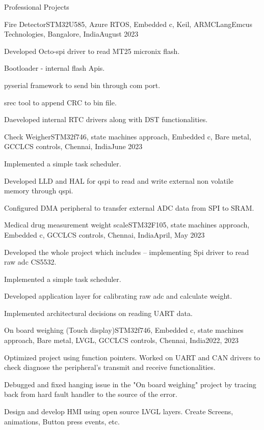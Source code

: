 \documentclass[]{Vetri-Resume}
\begin{document}
\begin{section}{Professional Projects}
\begin{subsection}{Fire Detector}{STM32U585, Azure RTOS, Embedded c, Keil, ARMCLang}{Emcus Technologies, Bangalore, India}{August 2023}
    \item{Developed Octo-spi driver to read MT25 micronix flash.}
    \item{Bootloader - internal flash Apis.}
    \item{pyserial framework to send bin through com port.}
    \item{srec tool to append CRC to bin file.}
    \item{Daeveloped internal RTC drivers along with DST functionalities.}

\end{subsection}



\begin{subsection}{Check Weigher}{STM32f746, state machines approach, Embedded c, Bare metal, GCC}{LCS controls, Chennai, India}{June 2023}
    \item{Implemented a simple task scheduler.}
    \item{Developed LLD and HAL for qspi to read and write external non volatile memory through qspi.}
    \item{Configured DMA peripheral to transfer external ADC data from SPI to SRAM.}
\end{subsection}
\begin{subsection}{Medical drug measurement weight scale}{STM32F105, state machines approach, Embedded c, GCC}{LCS controls, Chennai, India}{April, May 2023}
    \item{Developed the whole project which includes – implementing Spi driver to read raw adc CS5532.}
    \item{Implemented a simple task scheduler.}
    \item{Developed application layer for calibrating raw adc and calculate weight.}
    \item{Implemented architectural decisions on reading UART data.}
\end{subsection}

\begin{subsection}{On board weighing (Touch display)}{STM32f746, Embedded c, state machines approach, Bare metal, LVGL, GCC}{LCS controls, Chennai, India}{2022, 2023}
     \item{Optimized project using function pointers. Worked on UART and CAN drivers to check diagnose the peripheral’s transmit and receive functionalities. 
    \item Debugged and fixed hanging issue in the "On board weighing" project by tracing back from hard fault handler to the source of the error.
    \item Design and develop HMI using open source LVGL layers. Create Screens, animations, Button press events, etc.}
\end{subsection}


\end{section}
\end{document}
